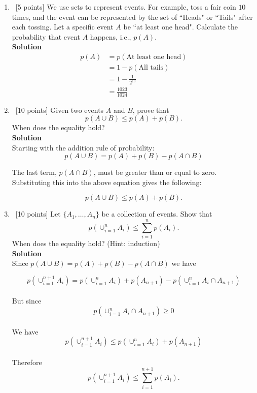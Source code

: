 \documentclass[12pt, fullpage,letterpaper]{article}
\newcommand{\solution}{\textbf{\large Solution}}
\begin{document}
%
\begin{enumerate}
\item~[5 points] We use sets to represent events. For example, toss a fair coin $10$ times, and the event can be represented by the set of ``Heads" or ``Tails" after each tossing. Let a specific event $A$ be ``at least one head". Calculate the probability that event $A$ happens, i.e., $p(A)$.
\\

\solution
\[
        \begin{split}
            p(A) &= p(\text{At least one head})
            \\
            &= 1 - p(\text{All tails})
            \\
            &= 1 - \frac{1}{2^{10}}
            \\
            &= \boxed{\frac{1023}{1024}}
        \end{split}
\]


\pagebreak

\label{sec:q2}
\item~[10 points] Given two events $A$ and $B$, prove that 
\[
p(A \cup B) \le p(A) + p(B).
\]
When does the equality hold?
\\

\solution
\\
Starting with the addition rule of probability:
\[
p(A \cup B) = p(A) + p(B) - p(A \cap B)
\]

The last term, $p(A \cap B)$, must be greater than or equal to zero. Substituting this into the above equation gives the following:

\[
p(A \cup B) \le p(A) + p(B).
\]

\pagebreak

\label{sec:q3}
\item~[10 points] Let $\{A_1, \ldots, A_n\}$ be a collection of events. Show that
\[
p(\cup_{i=1}^n A_i) \le \sum_{i=1}^n p(A_i).
\]
When does the equality hold? (Hint: induction)
\\

\solution
\\
Since $p(A \cup B) = p(A) + p(B) - p(A \cap B)$ we have

	\[
		p(\cup_{i=1}^{n+1} A_i) = p(\cup_{i=1}^{n} A_i) + p(A_{n+1}) - p(\cup_{i=1}^{n} A_i \cap A_{n+1})
	\]
	\\
But since 
	\[
		p(\cup_{i=1}^{n} A_i \cap A_{n+1}) \ge 0
	\]
	\\
We have
	\[
		p(\cup_{i=1}^{n+1} A_i) \le p(\cup_{i=1}^{n} A_i) + p(A_{n+1})
	\]
	\\
Therefore
\[
p(\cup_{i=1}^{n+1} A_i) \le \sum_{i=1}^{n+1} p(A_i).
\]




\end{enumerate}
\end{document}
